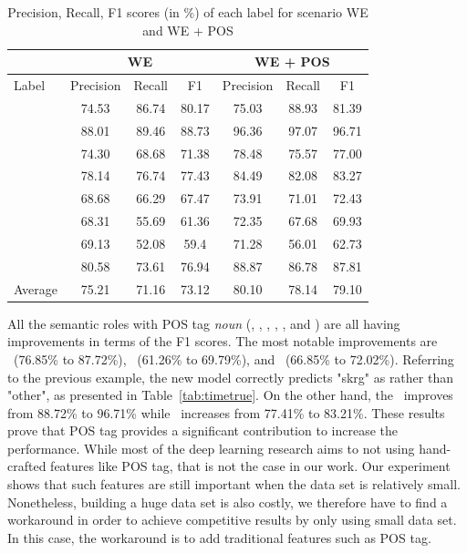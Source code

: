 \begin{table}
	\centering
	\caption{Precision, Recall, F1 scores (in \%) of each label for scenario WE and WE + POS}
	\label{tab:wevswepos}
	\begin{tabular}{|l|ccc|ccc|}
		\hline
		& \multicolumn{3}{c}{ WE } & \multicolumn{3}{c}{ WE + POS } \\
		\hline
		Label & Precision & Recall & F1 & Precision & Recall & F1 \\
		\hline\hline
		\agent & 74.53 & 86.74 & 80.17 & 75.03 & 88.93 & 81.39 \\
		\predicate & 88.01 & 89.46 & 88.73 & 96.36 & 97.07 & 96.71 \\
		\patient & 74.30 & 68.68 & 71.38 & 78.48 & 75.57 & 77.00 \\
		\modal & 78.14 & 76.74 & 77.43 & 84.49 & 82.08 & 83.27 \\
		\beneficiary & 68.68 & 66.29 & 67.47 & 73.91 & 71.01 & 72.43 \\
		\location & 68.31 & 55.69 & 61.36 & 72.35 & 67.68 & 69.93 \\
		\greet & 69.13 & 52.08 & 59.4 & 71.28 & 56.01 & 62.73 \\
		\timesrl & 80.58 & 73.61 & 76.94 & 88.87 & 86.78 & 87.81 \\
		\hline
		Average & 75.21 & 71.16 & 73.12 & 80.10 & 78.14 & 79.10 \\
		\hline
	\end{tabular}

\end{table}

All the semantic roles with POS tag \textit{noun} (\agent, \patient, \beneficiary, \location, \greet, and \timesrl) are all having improvements in terms of the F1 scores. The most notable improvements are \timesrl~(76.85\% to 87.72\%), \location~(61.26\% to 69.79\%), and \beneficiary~(66.85\% to 72.02\%). Referring to the previous example, the new model correctly predicts "skrg" as \timesrl rather than "other", as presented in Table~\ref{tab:timetrue}. On the other hand, the \predicate~improves from 88.72\% to 96.71\% while \modal~increases from 77.41\% to 83.21\%. These results prove that POS tag provides a significant contribution to increase the performance. While most of the deep learning research aims to not using hand-crafted features like POS tag, that is not the case in our work. Our experiment shows that such features are still important when the data set is relatively small. Nonetheless, building a huge data set is also costly, we therefore have to find a workaround in order to achieve competitive results by only using small data set. In this case, the workaround is to add traditional features such as POS tag.

